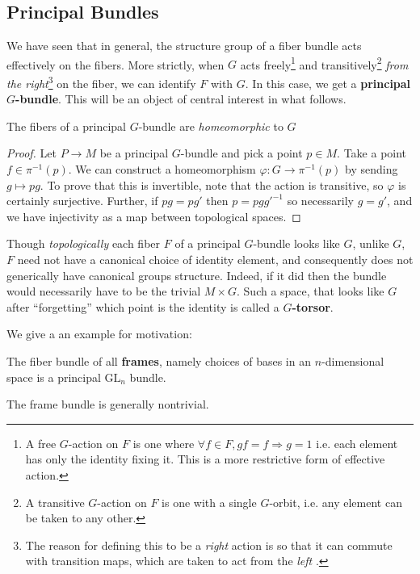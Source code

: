 		\subsection{Principal Bundles} %
		\label{sub:principal_bundles}
		

		
		We have seen that in general, the structure group of a fiber bundle acts effectively on the fibers. More strictly, when $G$ acts freely\footnote{A free $G$-action on $F$ is one where $\forall f \in F, gf = f \Rightarrow g = 1$ i.e. each element has only the identity fixing it. This is a more restrictive form of effective action.} and transitively\footnote{A transitive $G$-action on $F$ is one with a single $G$-orbit, i.e. any element can be taken to any other.} \emph{from the right}\footnote{The reason for defining this to be a \emph{right} action is so that it can commute with transition maps, which are taken to act from the \emph{left} \cite{stackoverflow1}.} on the fiber, we can identify $F$ with $G$. In this case, we get a \textbf{principal $G$-bundle}. This will be an object of central interest in what follows.
		
		\begin{obs}
			The fibers of a principal $G$-bundle are \emph{homeomorphic} to $G$
		\end{obs}
		\begin{proof}
			Let $P \to M$ be a principal $G$-bundle and pick a point $p \in M$. Take a point $f \in \pi^{-1}(p)$. We can construct a homeomorphism $\varphi: G \to \pi^{-1}(p)$ by sending $g \mapsto p g$. To prove that this is invertible, note that the action is transitive, so $\varphi$ is certainly surjective. Further, if $p g = p g'$ then $p = p g {g'}^{-1}$ so necessarily $g = g'$, and we have injectivity as a map between topological spaces.
		\end{proof}
		
		
		Though \emph{topologically} each fiber $F$ of a principal $G$-bundle looks like $G$, unlike $G$, $F$ need not have a canonical choice of identity element, and consequently does not generically have canonical groups structure. Indeed, if it did then the bundle would necessarily have to be the trivial $M \times G$. Such a space, that looks like $G$ after ``forgetting'' which point is the identity is called a \textbf{$G$-torsor}. 
		
		We give a an example for motivation:
		\begin{eg}
			The fiber bundle of all \textbf{frames}, namely choices of bases in an $n$-dimensional space is a principal $\mathrm{GL}_n$ bundle.
		\end{eg}
		The frame bundle is generally nontrivial. 
		
